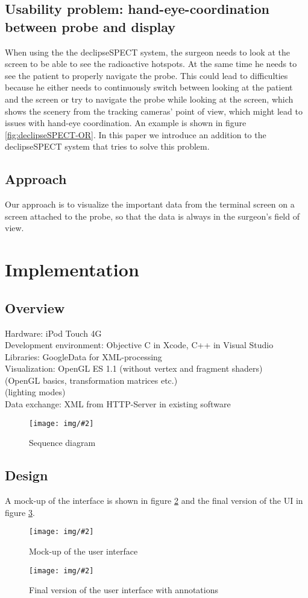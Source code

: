 \documentclass{scrartcl}
\newcommand{\red}[1]{{\color{red} #1}}
\newcommand{\graphic}[3][width=\linewidth] %
{
  \begin{figure}[h!t]
    \centering
    \texttt{[image: img/\#2]}
    \caption{#3}
    \label{fig:#2}
  \end{figure}
}
\newcommand{\refFigure}[1]{figure \ref{fig:#1}}
\begin{document}
\subsection{Usability problem: hand-eye-coordination between probe and display}
When using the the declipseSPECT system, the surgeon needs to look at the screen to be able to see the radioactive hotspots. At the same time he needs to see the patient to properly navigate the probe. This could lead to difficulties because he either needs to continuously switch between looking at the patient and the screen or try to navigate the probe while looking at the screen, which shows the scenery from the tracking cameras' point of view, which might lead to issues with hand-eye coordination. An example is shown in \refFigure{declipseSPECT-OR}.
In this paper we introduce an addition to the declipseSPECT system that tries to solve this problem.


\subsection{Approach}
Our approach is to visualize the important data from the terminal screen on a screen attached to the probe, so that the data is always in the surgeon's field of view. 



\section{Implementation}

\subsection{Overview}
Hardware: iPod Touch 4G\\
Development environment: Objective C in Xcode, C++ in Visual Studio\\
Libraries: GoogleData for XML-processing\\
Visualization: OpenGL ES 1.1 (without vertex and fragment shaders)\\
\red{(OpenGL basics, transformation matrices etc.)\\
(lighting modes)}\\
Data exchange: XML from HTTP-Server in existing software\\
\graphic[scale=.8]{sequence-diagram}{Sequence diagram}


\subsection{Design}
A mock-up of the interface is shown in \refFigure{mockup} and the final version of the UI in \refFigure{screen-annotated}.
\graphic[scale=.5]{mockup}{Mock-up of the user interface}
\graphic[scale=.5]{screen-annotated}{Final version of the user interface with annotations}
\end{document}
